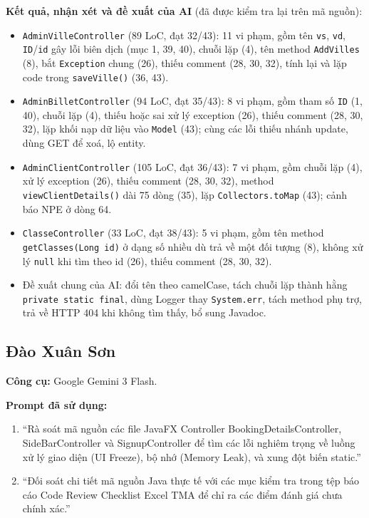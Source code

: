 \documentclass[12pt,a4paper]{article}
\begin{document}
\noindent\textbf{Kết quả, nhận xét và đề xuất của AI} (đã được kiểm tra lại trên mã nguồn):
\begin{itemize}[noitemsep]
  \item \texttt{AdminVilleController} (89 LoC, đạt 32/43): 11 vi phạm, gồm tên \texttt{vs}, \texttt{vd}, \texttt{ID}/\texttt{id} gây lỗi biên dịch (mục 1, 39, 40), chuỗi lặp (4), tên method \texttt{AddVilles} (8), bắt \texttt{Exception} chung (26), thiếu comment (28, 30, 32), tính lại và lặp code trong \texttt{saveVille()} (36, 43).
  \item \texttt{AdminBilletController} (94 LoC, đạt 35/43): 8 vi phạm, gồm tham số \texttt{ID} (1, 40), chuỗi lặp (4), thiếu hoặc sai xử lý exception (26), thiếu comment (28, 30, 32), lặp khối nạp dữ liệu vào \texttt{Model} (43); cùng các lỗi thiếu nhánh update, dùng GET để xoá, lộ entity.
  \item \texttt{AdminClientController} (105 LoC, đạt 36/43): 7 vi phạm, gồm chuỗi lặp (4), xử lý exception (26), thiếu comment (28, 30, 32), method \texttt{viewClientDetails()} dài 75 dòng (35), lặp \texttt{Collectors.toMap} (43); cảnh báo NPE ở dòng 64.
  \item \texttt{ClasseController} (33 LoC, đạt 38/43): 5 vi phạm, gồm tên method \texttt{getClasses(Long id)} ở dạng số nhiều dù trả về một đối tượng (8), không xử lý \texttt{null} khi tìm theo id (26), thiếu comment (28, 30, 32).
  \item Đề xuất chung của AI: đổi tên theo camelCase, tách chuỗi lặp thành hằng \texttt{private static final}, dùng Logger thay \texttt{System.err}, tách method phụ trợ, trả về HTTP 404 khi không tìm thấy, bổ sung Javadoc.
\end{itemize}

\subsection{Đào Xuân Sơn}
\textbf{Công cụ:} Google Gemini 3 Flash.

\noindent\textbf{Prompt đã sử dụng:}
\begin{enumerate}[noitemsep]
  \item ``Rà soát mã nguồn các file JavaFX Controller BookingDetailsController, SideBarController và SignupController để tìm các lỗi nghiêm trọng về luồng xử lý giao diện (UI Freeze), bộ nhớ (Memory Leak), và xung đột biến static.''
  \item ``Đối soát chi tiết mã nguồn Java thực tế với các mục kiểm tra trong tệp báo cáo Code Review Checklist Excel TMA để chỉ ra các điểm đánh giá chưa chính xác.''
\end{enumerate}
\end{document}
